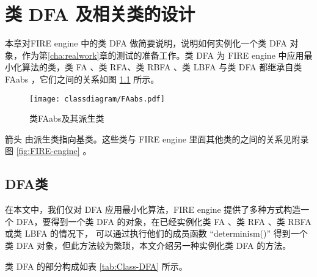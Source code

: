 \chapter{类 DFA 及相关类的设计}\label{cha:construct-dfa}

本章对FIRE engine 中的类 DFA 做简要说明，说明如何实例化一个类 DFA 对象，作为第\ref{cha:realwork}章的测试的准备工作。类 DFA 为 FIRE engine 中应用最小化算法的类，类 FA 、类 RFA、类 RBFA 、类 LBFA 与类 DFA 都继承自类 FAabs ，它们之间的关系如图 \ref{fig:FAabsRel} 所示。

\begin{figure}[!htbp]
    \centering
    \texttt{[image: classdiagram/FAabs.pdf]}
    \caption{类FAabs及其派生类}
    \label{fig:FAabsRel}
\end{figure}

箭头 {} 由派生类指向基类。这些类与 FIRE engine 里面其他类的之间的关系见附录图 \ref{fig:FIRE-engine} 。

\section{DFA类}
在本文中，我们仅对 DFA 应用最小化算法，FIRE engine 提供了多种方式构造一个 DFA，要得到一个类 DFA 的对象，在已经实例化类 FA 、类 RFA 、类 RBFA 或类 LBFA 的情况下， 可以通过执行他们的成员函数 “determinism()” 得到一个类 DFA 对象，但此方法较为繁琐，本文介绍另一种实例化类 DFA 的方法。


类 DFA 的部分构成如表 \ref{tab:Class-DFA} 所示。


